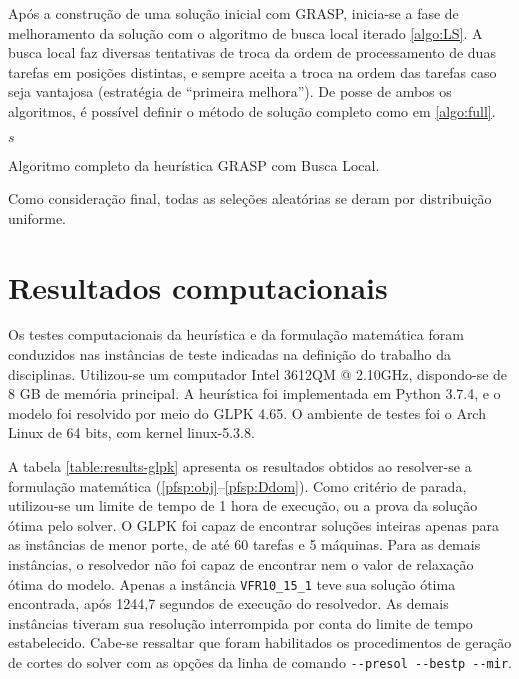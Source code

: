 \documentclass[12pt]{article}
\begin{document}
Após a construção de uma solução inicial com GRASP, inicia-se a fase de
melhoramento da solução com o algoritmo de busca local iterado \ref{algo:LS}.
A busca local faz diversas tentativas de troca da ordem de processamento de
duas tarefas em posições distintas, e sempre aceita a troca na ordem das
tarefas caso seja vantajosa (estratégia de ``primeira melhora''). De posse de
ambos os algoritmos, é possível definir o método de solução completo como em
\ref{algo:full}.

\begin{algorithm}[H]
   \footnotesize
   \Return $s$
   \caption{Algoritmo completo da heurística GRASP com Busca Local.}
   \label{algo:full}
\end{algorithm}

Como consideração final, todas as seleções aleatórias se deram
por distribuição uniforme. 

\section{Resultados computacionais}

Os testes computacionais da heurística e da formulação matemática foram
conduzidos nas instâncias de teste indicadas na definição do trabalho da
disciplinas. Utilizou-se um computador Intel 3612QM @ 2.10GHz, dispondo-se de
8 GB de memória principal. A heurística foi implementada em Python 
3.7.4, e o modelo foi resolvido por meio do GLPK 4.65. O ambiente de testes foi
o Arch Linux de 64 bits, com kernel linux-5.3.8.

A tabela \ref{table:results-glpk} apresenta os resultados obtidos ao
resolver-se a formulação matemática (\ref{pfsp:obj}--\ref{pfsp:Ddom}). Como
critério de parada, utilizou-se um limite de tempo de 1 hora de execução, ou
a prova da solução ótima pelo solver. O GLPK foi capaz de encontrar
soluções inteiras apenas para as instâncias de menor porte, de até 60 tarefas e
5 máquinas. Para as demais instâncias, o resolvedor não foi capaz de encontrar
nem o valor de relaxação ótima do modelo. Apenas a instância
\texttt{VFR10\_15\_1} teve sua solução ótima encontrada, após 1244,7 segundos de
execução do resolvedor. As demais instâncias tiveram sua resolução interrompida
por conta do limite de tempo estabelecido. Cabe-se ressaltar que foram
habilitados os procedimentos de geração de cortes do solver com as opções da
linha de comando \texttt{-{}-presol -{}-bestp -{}-mir}.
\end{document}
